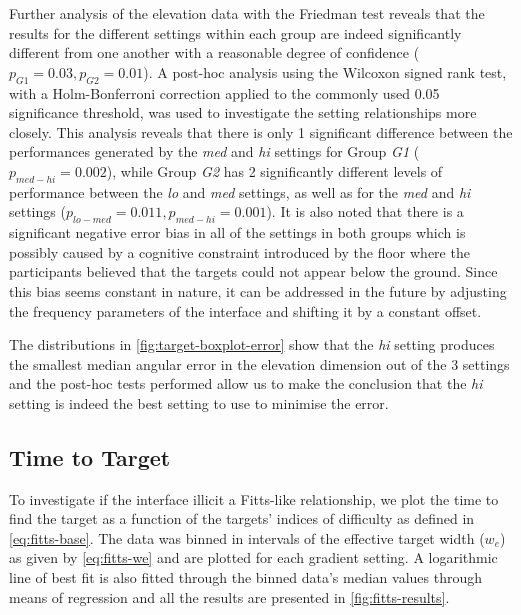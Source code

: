 \documentclass{article}
\begin{document}
Further analysis of the elevation data with the Friedman test reveals that the results for the different settings within each group are indeed significantly different from one another with a reasonable degree of confidence ($p_{G1} = 0.03, p_{G2} = 0.01$).
A post-hoc analysis using the Wilcoxon signed rank test, with a Holm-Bonferroni correction applied to the commonly used 0.05 significance threshold, was used to investigate the setting relationships more closely. 
This analysis reveals that there is only 1 significant difference between the performances generated by the \textit{med} and \textit{hi} settings for Group \textit{G1} ($p_{med-hi} = 0.002$), while Group \textit{G2} has 2 significantly different levels of performance between the \textit{lo} and \textit{med} settings, as well as for the \textit{med} and \textit{hi} settings ($p_{lo-med} = 0.011, p_{med-hi} = 0.001$).
It is also noted that there is a significant negative error bias in all of the settings in both groups which is possibly caused by a cognitive constraint introduced by the floor where the participants believed that the targets could not appear below the ground.
Since this bias seems constant in nature, it can be addressed in the future by adjusting the frequency parameters of the interface and shifting it by a constant offset. 

The distributions in \cref{fig:target-boxplot-error} show that the \textit{hi} setting produces the smallest median angular error in the elevation dimension out of the 3 settings and the post-hoc tests performed allow us to make the conclusion that the \textit{hi} setting is indeed the best setting to use to minimise the error. 

\subsection{Time to Target}

To investigate if the interface illicit a Fitts-like relationship, we plot the time to find the target as a function of the targets' indices of difficulty as defined in \cref{eq:fitts-base}.
The data was binned in intervals of the effective target width ($w_e$) as given by \cref{eq:fitts-we} and are plotted for each gradient setting. 
A logarithmic line of best fit is also fitted through the binned data's median values through means of regression and all the results are presented in \cref{fig:fitts-results}.
\end{document}
